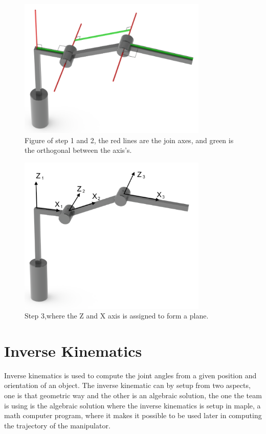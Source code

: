\begin{figure}[h]
    \centering
    \includegraphics[width=9cm]{Design/FK1.PNG}
    \caption{Figure of step 1 and 2, the red lines are the join axes, and green is the orthogonal between the axis's\cite{KinePics}.}
    \label{fig:FK1}
\end{figure}

\begin{figure}[h]
    \centering
    \includegraphics[width=9cm]{Design/FK2.PNG}
    \caption{Step 3,where the Z and X axis is assigned to form a plane\cite{KinePics}.}
    \label{fig:FK2}
\end{figure}


\newpage
\section{Inverse Kinematics}
Inverse kinematics is used to compute the joint angles from a given position and orientation of an object\cite{JohnC}. The inverse kinematic can by setup from two aspects, one is that geometric way and the other is an algebraic solution, the one the team is using is the algebraic solution where the inverse kinematics is setup in maple, a math computer program, where it makes it possible to be used later in computing the trajectory of the manipulator.\\
